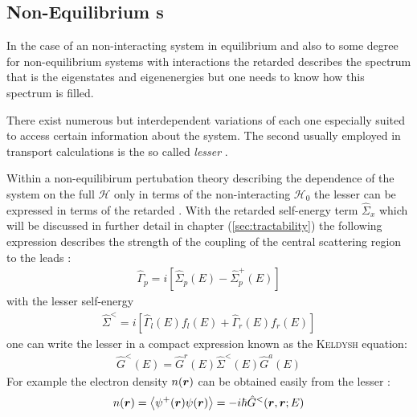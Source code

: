 \subsection{Non-Equilibrium \cgfnc s}
In the case of an non-interacting system in equilibrium and also to some degree for non-equilibrium systems with interactions the retarded \gfnc{} describes the spectrum that is the eigenstates and eigenenergies but one needs to know how this spectrum is filled.\par 
There exist numerous but interdependent variations of \gfnc{} each one especially suited to access certain information about the system.
The second \gfnc{} usually employed in transport calculations is the so called \emph{lesser \gfnc{}} \cite{haug2008quantum}.\par
Within a non-equilibirum pertubation theory describing the dependence of the system on the full \hamil{} $\mathcal{H}$ only in terms of the non-interacting \hamil{} $\mathcal{H}_0$\cite{Jauho2006} the lesser \gfnc{} can be expressed in terms of the retarded \gfnc{}. With the retarded self-energy term $\hat{\Sigma}_x$ which will be discussed in further detail in chapter (\ref{sec:tractability}) the following expression describes the strength of the coupling of the central scattering region to the leads \cite{datta2005quantum}:
\begin{align}
\hat{\Gamma}_p = i\left[\hat{\Sigma}_p(E)-\hat{\Sigma}_p^+(E)\right]
\end{align}
with the lesser self-energy
\begin{align}
\hat{\Sigma}^<=i\left[\hat{\Gamma}_l(E)f_l(E)+\hat{\Gamma}_r(E)f_r(E) \right]
\end{align}
one can write the lesser \gfnc{} in a compact expression known as the \textsc{Keldysh} equation:
\begin{align}
\hat{G}^<(E) = \hat{G}^r(E) \hat{\Sigma}^<(E) \hat{G}^a(E)
\label{eqn:keldyshequation}
\end{align}
For example the electron density  $n(\boldsymbol{r})$ can be obtained easily from the lesser \gfnc{}:
\begin{align}
	n(\boldsymbol{r}) = \left< \psi^+ (\boldsymbol{r}) \psi(\boldsymbol{r})\right> = -i\hbar \hat{G}^<(\boldsymbol{r},\boldsymbol{r};E)
	\label{eqn:edensfromgreensfnc}
\end{align}

